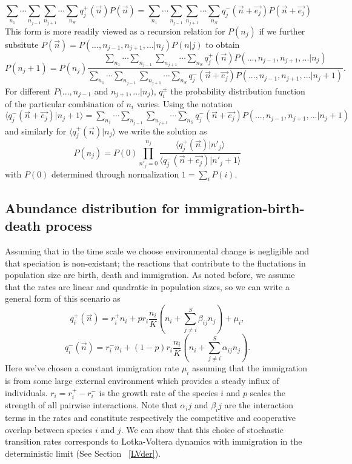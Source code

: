 \documentclass[11pt,a4paper,final]{iopart}
\begin{document}
\begin{equation*}
\sum_{n_1} \cdots \sum_{n_{j-1}}\sum_{n_{j+1}} \cdots \sum_{n_S} q_j^+(\vec{n})P(\vec{n}) = \sum_{n_1} \cdots \sum_{n_{j-1}}\sum_{n_{j+1}} \cdots \sum_{n_S} q_j^-(\vec{n}+\vec{e_j})P(\vec{n}+\vec{e_j})
\end{equation*}
This form is more readily viewed as a recursion relation for $P(n_j)$ if we further subsitute $P(\vec{n})=P(...,n_{j-1},n_{j+1},...|n_j)P(n|j)$ to obtain
\begin{equation}
P(n_j+1) = P(n_j) \frac{ \sum_{n_1} \cdots \sum_{n_{j-1}}\sum_{n_{j+1}} \cdots \sum_{n_S} q_j^+(\vec{n})P(...,n_{j-1},n_{j+1},...|n_j) } { \sum_{n_1} \cdots \sum_{n_{j-1}}\sum_{n_{j+1}} \cdots \sum_{n_S} q_j^-(\vec{n}+\vec{e_j})P(...,n_{j-1},n_{j+1},...|n_j +1 ) }.
\end{equation}
For different $P(...,n_{j-1}$ and $n_{j+1},...|n_j)$, $q_i^\pm$ the probability distribution function of the particular combination of $n_i$ varies.
Using the notation $\langle q^-_j(\vec{n}+\vec{e_j}) | n_j+1 \rangle =  \sum_{n_1} \cdots \sum_{n_{j-1}}\sum_{n_{j+1}} \cdots \sum_{n_S} q_j^-(\vec{n}+\vec{e_j})P(...,n_{j-1},n_{j+1},...|n_j +1 )$ and similarly for $\langle q^+_j(\vec{n}) | n_j \rangle$ we write the solution as 
\begin{equation}\label{solME}
P(n_j) = P(0)\prod_{n'_j=0}^{n_j} \frac{\langle q^+_j(\vec{n}) | n'_j \rangle}{\langle q^-_j(\vec{n}+\vec{e_j}) | n'_j + 1 \rangle}
\end{equation}
with $P(0)$ determined through normalization $1=\sum_i P(i)$.

\subsection{Abundance distribution for immigration-birth-death process}
 
Assuming that in the time scale we choose environmental change is negligible and that speciation is non-existant; the reactions that contribute to the fluctations in population size are birth, death and immigration.
As noted before, we assume that the rates are linear and quadratic in population sizes, so we can write a general form of this scenario as
\begin{equation*}
q^+_i(\vec{n}) = r_i^+ n_i + p r_i \frac{ n_i }{K}\left( n_i+\sum_{j\neq i}^S \beta_{ij} n_j \right) + \mu_i,
\end{equation*}
\begin{equation*}
q^-_i(\vec{n}) = r_i^- n_i + (1-p)r_i \frac{ n_i }{K}\left( n_i+\sum_{j\neq i}^S \alpha_{ij} n_j \right).
\end{equation*}
Here we've chosen a constant immigration rate $\mu_i$ assuming that the immigration is from some large external environment which provides a steady influx of individuals.
$r_i=r_i^+-r_i^-$ is the growth rate of the species $i$ and $p$ scales the strength of all pairwise interactions.
Note that $\alpha_ij$ and  $\beta_ij$ are the interaction terms in the rates and constitute respectively the competitive and cooperative overlap between species $i$ and $j$.
We can show that this choice of stochastic transition rates corresponds to Lotka-Voltera dynamics with immigration in the deterministic limit (See Section ~\ref{LVder}).
\end{document}
